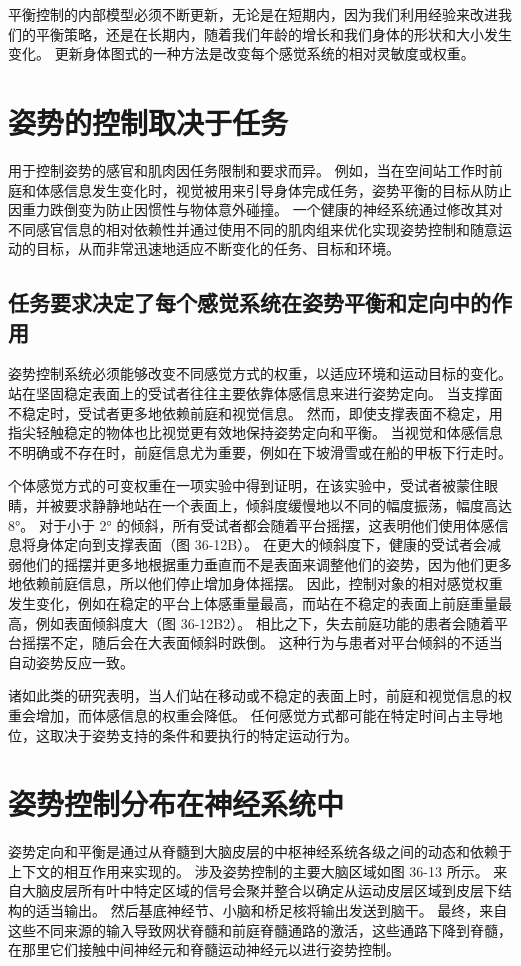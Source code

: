 平衡控制的内部模型必须不断更新，无论是在短期内，因为我们利用经验来改进我们的平衡策略，还是在长期内，随着我们年龄的增长和我们身体的形状和大小发生变化。 更新身体图式的一种方法是改变每个感觉系统的相对灵敏度或权重。


\section{姿势的控制取决于任务}
用于控制姿势的感官和肌肉因任务限制和要求而异。 例如，当在空间站工作时前庭和体感信息发生变化时，视觉被用来引导身体完成任务，姿势平衡的目标从防止因重力跌倒变为防止因惯性与物体意外碰撞。 一个健康的神经系统通过修改其对不同感官信息的相对依赖性并通过使用不同的肌肉组来优化实现姿势控制和随意运动的目标，从而非常迅速地适应不断变化的任务、目标和环境。

\subsection{任务要求决定了每个感觉系统在姿势平衡和定向中的作用}
姿势控制系统必须能够改变不同感觉方式的权重，以适应环境和运动目标的变化。 站在坚固稳定表面上的受试者往往主要依靠体感信息来进行姿势定向。 当支撑面不稳定时，受试者更多地依赖前庭和视觉信息。 然而，即使支撑表面不稳定，用指尖轻触稳定的物体也比视觉更有效地保持姿势定向和平衡。 当视觉和体感信息不明确或不存在时，前庭信息尤为重要，例如在下坡滑雪或在船的甲板下行走时。

个体感觉方式的可变权重在一项实验中得到证明，在该实验中，受试者被蒙住眼睛，并被要求静静地站在一个表面上，倾斜度缓慢地以不同的幅度振荡，幅度高达 8°。 对于小于 2° 的倾斜，所有受试者都会随着平台摇摆，这表明他们使用体感信息将身体定向到支撑表面（图 36-12B）。 在更大的倾斜度下，健康的受试者会减弱他们的摇摆并更多地根据重力垂直而不是表面来调整他们的姿势，因为他们更多地依赖前庭信息，所以他们停止增加身体摇摆。 因此，控制对象的相对感觉权重发生变化，例如在稳定的平台上体感重量最高，而站在不稳定的表面上前庭重量最高，例如表面倾斜度大（图 36-12B2）。 相比之下，失去前庭功能的患者会随着平台摇摆不定，随后会在大表面倾斜时跌倒。 这种行为与患者对平台倾斜的不适当自动姿势反应一致。

诸如此类的研究表明，当人们站在移动或不稳定的表面上时，前庭和视觉信息的权重会增加，而体感信息的权重会降低。 任何感觉方式都可能在特定时间占主导地位，这取决于姿势支持的条件和要执行的特定运动行为。


\section{姿势控制分布在神经系统中}
姿势定向和平衡是通过从脊髓到大脑皮层的中枢神经系统各级之间的动态和依赖于上下文的相互作用来实现的。 涉及姿势控制的主要大脑区域如图 36-13 所示。 来自大脑皮层所有叶中特定区域的信号会聚并整合以确定从运动皮层区域到皮层下结构的适当输出。 然后基底神经节、小脑和桥足核将输出发送到脑干。 最终，来自这些不同来源的输入导致网状脊髓和前庭脊髓通路的激活，这些通路下降到脊髓，在那里它们接触中间神经元和脊髓运动神经元以进行姿势控制。

